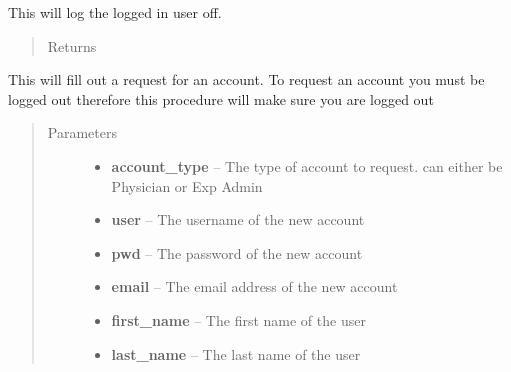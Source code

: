 \documentclass[letterpaper,10pt,english]{sphinxmanual}
\begin{document}
\begin{fulllineitems}
\begin{fulllineitems}
\begin{quote}
\begin{description}
\end{description}\end{quote}

\end{fulllineitems}


\begin{fulllineitems}
\label{STD/WebUI:WebUI.WebUI.WebUI.logoff}
This will log the logged in user off.
\begin{quote}\begin{description}
\item[{Returns}] \leavevmode


\end{description}\end{quote}

\end{fulllineitems}


\begin{fulllineitems}
\label{STD/WebUI:WebUI.WebUI.WebUI.request_account}
This will fill out a request for an account. To request an account you must be logged out therefore
this procedure will make sure you are logged out
\begin{quote}\begin{description}
\item[{Parameters}] \leavevmode\begin{itemize}
\item {} 
\textbf{account\_type} -- The type of account to request. can either be Physician or Exp Admin

\item {} 
\textbf{user} -- The username of the new account

\item {} 
\textbf{pwd} -- The password of the new account

\item {} 
\textbf{email} -- The email address of the new account

\item {} 
\textbf{first\_name} -- The first name of the user

\item {} 
\textbf{last\_name} -- The last name of the user


\end{itemize}
\end{description}
\end{quote}
\end{fulllineitems}
\end{fulllineitems}
\end{document}
